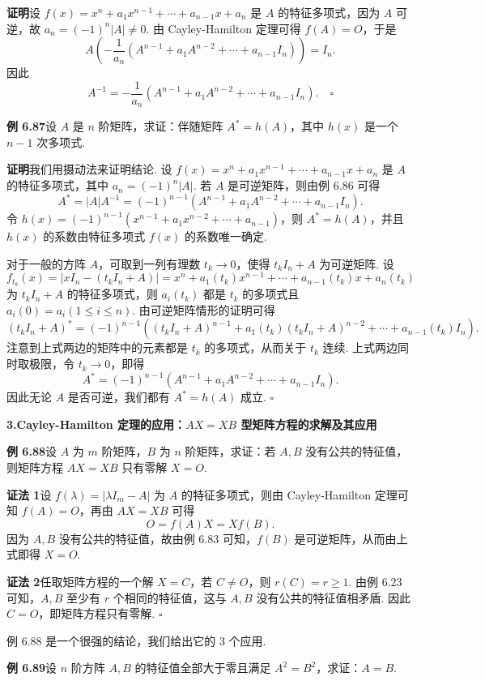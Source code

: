 \documentclass[UTF8, 12pt, fontset=fandol, oneside]{ctexart}
\begin{document}
\noindent\textbf{证明}\quad 设 $f(x)=x^n+a_1x^{n-1}+\cdots+a_{n-1}x+a_n$ 是 $A$ 的特征多项式，因为 $A$ 可逆，故 $a_n=(-1)^n|A|\ne 0$. 由 Cayley-Hamilton 定理可得 $f(A)=O$，于是
\[
A\left(-\frac{1}{a_n}(A^{n-1}+a_1A^{n-2}+\cdots+a_{n-1}I_n)\right)=I_n.
\]
因此
\[
A^{-1}=-\frac{1}{a_n}(A^{n-1}+a_1A^{n-2}+\cdots+a_{n-1}I_n). \quad \square
\]

\noindent\textbf{例 6.87}\quad 设 $A$ 是 $n$ 阶矩阵，求证：伴随矩阵 $A^*=h(A)$，其中 $h(x)$ 是一个 $n-1$ 次多项式.

\noindent\textbf{证明}\quad 我们用摄动法来证明结论. 设 $f(x)=x^n+a_1x^{n-1}+\cdots+a_{n-1}x+a_n$ 是 $A$ 的特征多项式，其中 $a_n=(-1)^n|A|$. 若 $A$ 是可逆矩阵，则由例 6.86 可得
\[
A^*=|A|A^{-1}=(-1)^{n-1}(A^{n-1}+a_1A^{n-2}+\cdots+a_{n-1}I_n).
\]
令 $h(x)=(-1)^{n-1}(x^{n-1}+a_1x^{n-2}+\cdots+a_{n-1})$，则 $A^*=h(A)$，并且 $h(x)$ 的系数由特征多项式 $f(x)$ 的系数唯一确定.

对于一般的方阵 $A$，可取到一列有理数 $t_k\to 0$，使得 $t_kI_n+A$ 为可逆矩阵. 设
\[
f_{t_k}(x)=|xI_n-(t_kI_n+A)|=x^n+a_1(t_k)x^{n-1}+\cdots+a_{n-1}(t_k)x+a_n(t_k)
\]
为 $t_kI_n+A$ 的特征多项式，则 $a_i(t_k)$ 都是 $t_k$ 的多项式且 $a_i(0)=a_i(1\le i\le n)$. 由可逆矩阵情形的证明可得
\[
(t_kI_n+A)^*=(-1)^{n-1}\left((t_kI_n+A)^{n-1}+a_1(t_k)(t_kI_n+A)^{n-2}+\cdots+a_{n-1}(t_k)I_n\right).
\]
注意到上式两边的矩阵中的元素都是 $t_k$ 的多项式，从而关于 $t_k$ 连续. 上式两边同时取极限，令 $t_k\to 0$，即得
\[
A^*=(-1)^{n-1}(A^{n-1}+a_1A^{n-2}+\cdots+a_{n-1}I_n).
\]
因此无论 $A$ 是否可逆，我们都有 $A^*=h(A)$ 成立. $\square$

\noindent\textbf{3.\quad Cayley-Hamilton 定理的应用：$AX=XB$ 型矩阵方程的求解及其应用}

\noindent\textbf{例 6.88}\quad 设 $A$ 为 $m$ 阶矩阵，$B$ 为 $n$ 阶矩阵，求证：若 $A,B$ 没有公共的特征值，则矩阵方程 $AX=XB$ 只有零解 $X=O$.

\noindent\textbf{证法 1}\quad 设 $f(\lambda)=|\lambda I_m-A|$ 为 $A$ 的特征多项式，则由 Cayley-Hamilton 定理可知 $f(A)=O$，再由 $AX=XB$ 可得
\[
O=f(A)X=Xf(B).
\]
因为 $A,B$ 没有公共的特征值，故由例 6.83 可知，$f(B)$ 是可逆矩阵，从而由上式即得 $X=O$.

\noindent\textbf{证法 2}\quad 任取矩阵方程的一个解 $X=C$，若 $C\ne O$，则 $r(C)=r\ge 1$. 由例 6.23 可知，$A,B$ 至少有 $r$ 个相同的特征值，这与 $A,B$ 没有公共的特征值相矛盾. 因此 $C=O$，即矩阵方程只有零解. $\square$

例 6.88 是一个很强的结论，我们给出它的 $3$ 个应用.

\noindent\textbf{例 6.89}\quad 设 $n$ 阶方阵 $A,B$ 的特征值全部大于零且满足 $A^2=B^2$，求证：$A=B$.
\end{document}

